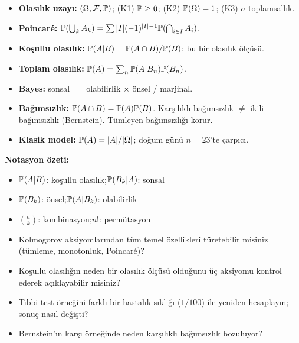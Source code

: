 \begin{bolumozeti}
\begin{itemize}
  \item \textbf{Olasılık uzayı:} $(\Omega,\mathcal{F},\mathbb{P})$; (K1) $\mathbb{P} \geq 0$;
        (K2) $\mathbb{P}(\Omega)=1$; (K3) $\sigma$-toplamsallık.
  \item \textbf{Poincaré:} $\mathbb{P}(\bigcup_k A_k) = \sum|I|(-1)^{|I|-1}\mathbb{P}(\bigcap_{i\in I}A_i)$.
  \item \textbf{Koşullu olasılık:} $\mathbb{P}(A|B) = \mathbb{P}(A \cap B)/\mathbb{P}(B)$;
        bu bir olasılık ölçüsü.
  \item \textbf{Toplam olasılık:} $\mathbb{P}(A) = \sum_n \mathbb{P}(A|B_n)\mathbb{P}(B_n)$.
  \item \textbf{Bayes:} sonsal $= $ olabilirlik $\times$ önsel / marjinal.
  \item \textbf{Bağımsızlık:} $\mathbb{P}(A \cap B) = \mathbb{P}(A)\mathbb{P}(B)$.
        Karşılıklı bağımsızlık $\neq$ ikili bağımsızlık (Bernstein).
        Tümleyen bağımsızlığı korur.
  \item \textbf{Klasik model:} $\mathbb{P}(A) = |A|/|\Omega|$;
        doğum günü $n=23$'te çarpıcı.
\end{itemize}

\medskip\noindent\textbf{Notasyon özeti:}
\begin{itemize}
  \item $\mathbb{P}(A|B)$: koşullu olasılık;\quad $\mathbb{P}(B_k|A)$: sonsal
  \item $\mathbb{P}(B_k)$: önsel;\quad $\mathbb{P}(A|B_k)$: olabilirlik
  \item $\binom{n}{k}$: kombinasyon;\quad $n!$: permütasyon
\end{itemize}
\end{bolumozeti}

\begin{ozyansima}
\begin{itemize}
  \item Kolmogorov aksiyomlarından tüm temel özellikleri türetebilir misiniz
        (tümleme, monotonluk, Poincaré)?
  \item Koşullu olasılığın neden bir olasılık ölçüsü olduğunu üç aksiyomu
        kontrol ederek açıklayabilir misiniz?
  \item Tıbbi test örneğini farklı bir hastalık sıklığı ($1/100$) ile yeniden
        hesaplayın; sonuç nasıl değişti?
  \item Bernstein'ın karşı örneğinde neden karşılıklı bağımsızlık bozuluyor?
\end{itemize}
\end{ozyansima}

